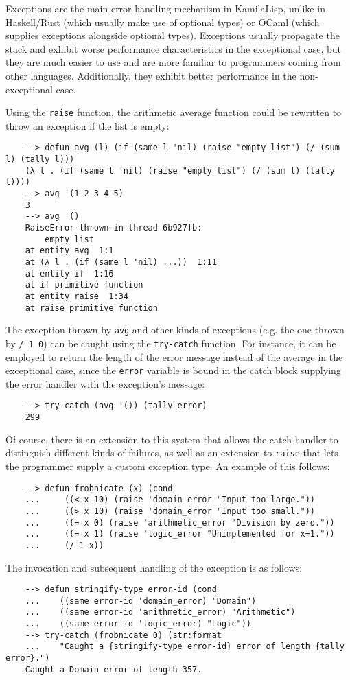 Exceptions are the main error handling mechanism in KamilaLisp, unlike in Haskell/Rust (which usually make use of optional types) or OCaml (which supplies exceptions alongside optional types). Exceptions usually propagate the stack and exhibit worse performance characteristics in the exceptional case, but they are much easier to use and are more familiar to programmers coming from other languages. Additionally, they exhibit better performance in the non-exceptional case.

Using the \verb|raise| function, the arithmetic average function could be rewritten to throw an exception if the list is empty:

\begin{Verbatim}
    --> defun avg (l) (if (same l 'nil) (raise "empty list") (/ (sum l) (tally l)))
    (λ l . (if (same l 'nil) (raise "empty list") (/ (sum l) (tally l))))
    --> avg '(1 2 3 4 5)
    3
    --> avg '()
    RaiseError thrown in thread 6b927fb:
        empty list
    at entity avg  1:1
    at (λ l . (if (same l 'nil) ...))  1:11
    at entity if  1:16
    at if primitive function
    at entity raise  1:34
    at raise primitive function
\end{Verbatim}

The exception thrown by \verb|avg| and other kinds of exceptions (e.g. the one thrown by \verb|/ 1 0|) can be caught using the \verb|try-catch| function. For instance, it can be employed to return the length of the error message instead of the average in the exceptional case, since the \verb|error| variable is bound in the catch block supplying the error handler with the exception's message:

\begin{Verbatim}
    --> try-catch (avg '()) (tally error)
    299
\end{Verbatim}

Of course, there is an extension to this system that allows the catch handler to distinguish different kinds of failures, as well as an extension to \verb|raise| that lets the programmer supply a custom exception type. An example of this follows:

\begin{Verbatim}
    --> defun frobnicate (x) (cond
    ...     ((< x 10) (raise 'domain_error "Input too large."))
    ...     ((> x 10) (raise 'domain_error "Input too small."))
    ...     ((= x 0) (raise 'arithmetic_error "Division by zero."))
    ...     ((= x 1) (raise 'logic_error "Unimplemented for x=1."))
    ...     (/ 1 x))
\end{Verbatim}

The invocation and subsequent handling of the exception is as follows:

\begin{Verbatim}
    --> defun stringify-type error-id (cond
    ...    ((same error-id 'domain_error) "Domain")
    ...    ((same error-id 'arithmetic_error) "Arithmetic")
    ...    ((same error-id 'logic_error) "Logic"))
    --> try-catch (frobnicate 0) (str:format
    ...    "Caught a {stringify-type error-id} error of length {tally error}.")
    Caught a Domain error of length 357.
\end{Verbatim}
